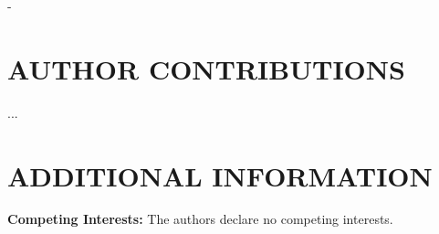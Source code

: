 -\documentclass[prd,twocolumn,tightenlines,preprintnumbers,showpacs,superscriptaddress,notitlepage,nofootinbib,eqsecnum,floatfix,longbibliography]{revtex4}
\begin{document}
\section{AUTHOR CONTRIBUTIONS}

...

\section{ADDITIONAL INFORMATION}

\textbf{Competing Interests:} The authors declare no competing interests.


\end{document}
